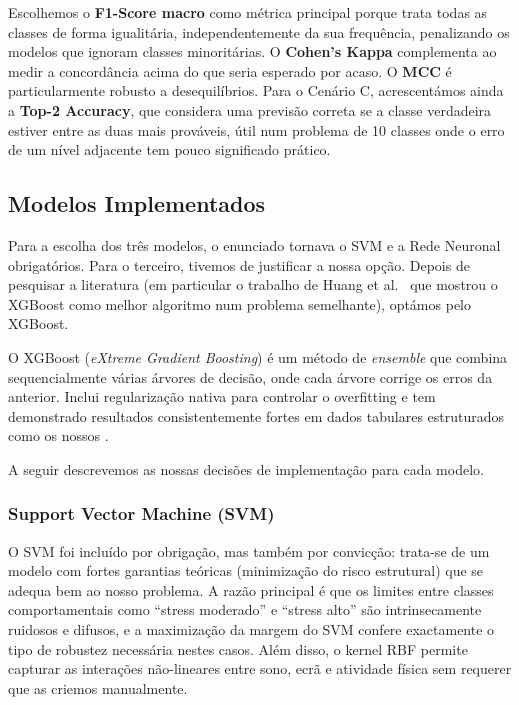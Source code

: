 \documentclass[12pt,a4paper]{article}
\begin{document}
Escolhemos o \textbf{F1-Score macro} como métrica principal porque trata todas as classes
de forma igualitária, independentemente da sua frequência, penalizando os modelos que
ignoram classes minoritárias. O \textbf{Cohen's Kappa} complementa ao medir a concordância
acima do que seria esperado por acaso. O \textbf{MCC} é particularmente robusto a
desequilíbrios. Para o Cenário C, acrescentámos ainda a \textbf{Top-2 Accuracy}, que
considera uma previsão correta se a classe verdadeira estiver entre as duas mais prováveis,
útil num problema de 10 classes onde o erro de um nível adjacente tem pouco significado
prático.

\subsection{Modelos Implementados}

Para a escolha dos três modelos, o enunciado tornava o SVM e a Rede Neuronal obrigatórios.
Para o terceiro, tivemos de justificar a nossa opção. Depois de pesquisar a literatura (em particular o trabalho de Huang et al.\ \cite{huang2024}
que mostrou o XGBoost como melhor algoritmo num problema semelhante), optámos pelo XGBoost.

O XGBoost (\textit{eXtreme Gradient Boosting}) \cite{chen2016} é um método de
\textit{ensemble} que combina sequencialmente várias árvores de decisão, onde cada
árvore corrige os erros da anterior. Inclui regularização nativa para controlar o
overfitting e tem demonstrado resultados consistentemente fortes em dados tabulares
estruturados como os nossos \cite{shwartz2022}.

A seguir descrevemos as nossas decisões de implementação para cada modelo.

\subsubsection{Support Vector Machine (SVM)}

O SVM \cite{cortes1995} foi incluído por obrigação, mas também por convicção: trata-se de
um modelo com fortes garantias teóricas (minimização do risco estrutural) que se adequa
bem ao nosso problema. A razão principal é que os limites entre classes comportamentais
como ``stress moderado'' e ``stress alto'' são intrinsecamente ruidosos e difusos, e a
maximização da margem do SVM confere exactamente o tipo de robustez necessária nestes
casos. Além disso, o kernel RBF permite capturar as interações não-lineares entre sono,
ecrã e atividade física sem requerer que as criemos manualmente.
\end{document}
